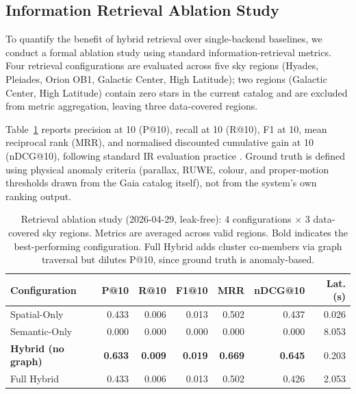 \documentclass[preprint,12pt,authoryear]{elsarticle}
\begin{document}
\subsection{Information Retrieval Ablation Study}
\label{sec:ablation}

To quantify the benefit of hybrid retrieval over single-backend baselines, we conduct a formal ablation study using standard information-retrieval metrics. Four retrieval configurations are evaluated across five sky regions (Hyades, Pleiades, Orion OB1, Galactic Center, High Latitude); two regions (Galactic Center, High Latitude) contain zero stars in the current catalog and are excluded from metric aggregation, leaving three data-covered regions.

Table~\ref{tab:ablation} reports precision at 10 (P@10), recall at 10 (R@10), F1 at 10, mean reciprocal rank (MRR), and normalised discounted cumulative gain at 10 (nDCG@10), following standard IR evaluation practice \citep{Manning2008, Jarvelin2002}. Ground truth is defined using physical anomaly criteria (parallax, RUWE, colour, and proper-motion thresholds drawn from the Gaia catalog itself), not from the system's own ranking output.

\begin{table}[htbp]
\centering
\caption{Retrieval ablation study (2026-04-29, leak-free): 4 configurations $\times$ 3 data-covered sky regions. Metrics are averaged across valid regions. Bold indicates the best-performing configuration. Full Hybrid adds cluster co-members via graph traversal but dilutes P@10, since ground truth is anomaly-based.
}
\label{tab:ablation}
\begin{tabular}{lrrrrrr}
\toprule
\textbf{Configuration} & \textbf{P@10} & \textbf{R@10} & \textbf{F1@10} & \textbf{MRR} & \textbf{nDCG@10} & \textbf{Lat. (s)} \\
\midrule
Spatial-Only                    & 0.433 & 0.006 & 0.013 & 0.502 & 0.437 & 0.026 \\
Semantic-Only                   & 0.000 & 0.000 & 0.000 & 0.000 & 0.000 & 8.053 \\
\textbf{Hybrid (no graph)}      & \textbf{0.633} & \textbf{0.009} & \textbf{0.019} & \textbf{0.669} & \textbf{0.645} & 0.203 \\
Full Hybrid                     & 0.433 & 0.006 & 0.013 & 0.502 & 0.426 & 2.053 \\
\bottomrule
\end{tabular}
\end{table}
\end{document}
